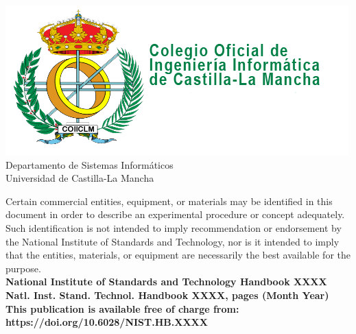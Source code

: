 \documentclass[12pt]{article}
\newcommand{\pubnumber}{XXXX}
\newcommand{\DOI}{https://doi.org/10.6028/NIST.HB.XXXX}
\newcommand{\monthyear}{Month Year}
\begin{document}
\begin{titlepage}
\begin{flushright}
\includegraphics[width=0.5\linewidth]{figs/logo-cooiiclm.png}\\ 
 \vfill
\footnotesize Departamento de Sistemas Informáticos\\ 
\vspace{10pt}
Universidad de Castilla-La Mancha\\ 
\end{flushright}
\end{titlepage}
\begin{titlepage}
\begin{flushright}
\footnotesize  Certain commercial entities, equipment, or materials may be identified in this document in order to describe an experimental procedure or concept adequately. Such identification is not intended to imply recommendation or endorsement by the National Institute of Standards and Technology, nor is it intended to imply that the entities, materials, or equipment are necessarily the best available for the purpose.\\ 

\vfill
\normalsize \textbf{National Institute of Standards and Technology Handbook \pubnumber\\ 
Natl. Inst. Stand. Technol. Handbook \pubnumber, \pageref{LastPage} pages (\monthyear)} \\
\vspace{12pt}
\textbf{This publication is available free of charge from: \DOI}
\vfill
\end{flushright}
\end{titlepage}
\end{document}
